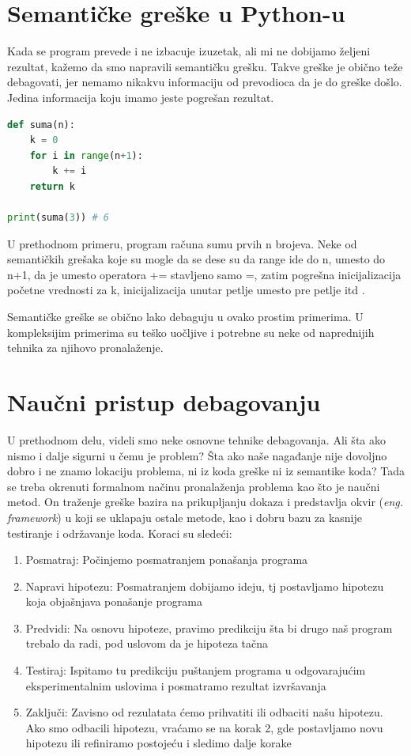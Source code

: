 \documentclass[a4paper]{article}
\begin{document}
\section{Semantičke greške u Python-u}	
Kada se program prevede i ne izbacuje izuzetak, ali mi ne dobijamo željeni rezultat, kažemo da smo napravili semantičku grešku. Takve greške je obično teže debagovati, jer nemamo nikakvu informaciju od prevodioca da je do greške došlo. Jedina informacija koju imamo jeste pogrešan rezultat.
\begin{lstlisting}[language = python, caption = {Funkcija koja računa sumu prvih n brojeva}]
def suma(n):
    k = 0
    for i in range(n+1):
        k += i
    return k

print(suma(3)) # 6
\end{lstlisting}

U prethodnom primeru, program računa sumu prvih n brojeva. Neke od semantičkih grešaka koje su mogle da se dese su da range ide do n, umesto do n+1, da je umesto operatora += stavljeno samo =, zatim pogrešna inicijalizacija početne vrednosti za k, inicijalizacija unutar petlje umesto pre petlje itd \cite{proPyDeb}.

Semantičke greške se obično lako debaguju u ovako prostim primerima. U kompleksijim primerima su teško uočljive i potrebne su neke od naprednijih tehnika za njihovo pronalaženje.

\section{Naučni pristup debagovanju}
U prethodnom delu, videli smo neke osnovne tehnike debagovanja. Ali šta ako nismo i dalje sigurni u čemu je problem? Šta ako naše nagađanje nije dovoljno dobro i ne znamo lokaciju problema, ni iz koda greške ni iz semantike koda? Tada se treba okrenuti formalnom načinu pronalaženja problema kao što je naučni metod. On traženje greške bazira na prikupljanju dokaza i predstavlja okvir (\emph{eng. framework}) u koji se uklapaju ostale metode, kao i dobru bazu za kasnije testiranje i održavanje koda.
	 Koraci su sledeći\cite{proPyDeb}:
	 \begin{enumerate}
	     \item Posmatraj: Počinjemo posmatranjem ponašanja programa 
	     \item Napravi hipotezu: Posmatranjem dobijamo ideju, tj postavljamo hipotezu koja objašnjava ponašanje programa
	     \item Predvidi: Na osnovu hipoteze, pravimo predikciju šta bi drugo naš program trebalo da radi, pod uslovom da je hipoteza tačna
	     \item Testiraj: Ispitamo tu predikciju puštanjem programa u odgovarajućim eksperimentalnim uslovima i posmatramo rezultat izvršavanja
	     \item Zaključi: Zavisno od rezulatata ćemo prihvatiti ili odbaciti našu hipotezu. Ako smo odbacili hipotezu, vraćamo se na korak 2, gde postavljamo novu hipotezu ili refiniramo postojeću i sledimo dalje korake
	 \end{enumerate}
\end{document}
